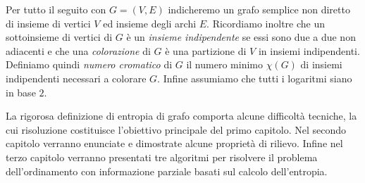 Per tutto il seguito con $G=(V,E)$ indicheremo un grafo semplice non diretto di insieme di vertici $V$ ed insieme degli archi $E$. Ricordiamo inoltre che un sottoinsieme di vertici di $G$ è un \emph{insieme indipendente} se essi sono due a due non adiacenti e che una \emph{colorazione} di $G$ è una partizione di $V$ in insiemi indipendenti. Definiamo quindi \emph{numero cromatico} di $G$ il numero minimo $\chi(G)$ di insiemi indipendenti necessari a colorare $G$. Infine assumiamo che tutti i logaritmi siano in base $2$.

La rigorosa definizione di entropia di grafo comporta alcune difficoltà tecniche, la cui risoluzione costituisce l'obiettivo principale del primo capitolo. Nel secondo capitolo verranno enunciate e dimostrate alcune proprietà di rilievo. Infine nel terzo capitolo verranno presentati tre algoritmi per risolvere il problema dell'ordinamento con informazione parziale basati sul calcolo dell'entropia. 
